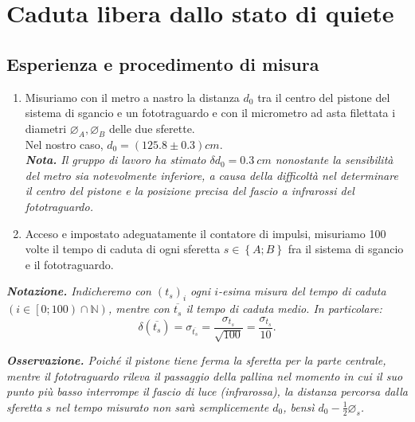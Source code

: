 \documentclass{article}
\newcommand*{\diam}{\varnothing}
\begin{document}
\section{Caduta libera dallo stato di quiete}
\subsection{Esperienza e procedimento di misura}
\begin{enumerate}
    \item
        Misuriamo con il metro a nastro la distanza $d_0$ tra il centro
        del pistone del sistema di sgancio e un fototraguardo e con il
        micrometro ad asta filettata i diametri $\diam_A,\diam_B$ delle
        due sferette.\\
        Nel nostro caso, $d_0 = \left(125.8\pm 0.3\right)\unit{cm}$.\\
        \emph{
            \textbf{Nota.} Il gruppo di lavoro ha stimato
            $\delta d_0 = \qty{0.3}{cm}$ nonostante la sensibilità
            del metro sia notevolmente inferiore, a causa della difficoltà
            nel determinare il centro del pistone e la posizione precisa del
            fascio a infrarossi del fototraguardo.
        }
    \item
        Acceso e impostato adeguatamente il contatore di impulsi,
        misuriamo 100 volte il tempo di caduta di ogni sferetta
        $s\in\left\{A;B\right\}$
        fra il sistema di sgancio e il fototraguardo.
\end{enumerate}

\emph{
    \textbf{Notazione.} Indicheremo con $\left(t_s\right)_i$
    ogni $i$-esima misura del tempo di caduta
    $\left(i\in\left[0;100\right)\cap\mathbb{N}\right)$,
    mentre con $\overline{t_s}$ il tempo di caduta medio.
    In particolare:\[
        \delta\!\left(\overline{t_s}\right) = \sigma_{\overline{t_s}} =
        \frac{\sigma_{t_s}}{\sqrt{100}}   = \frac{\sigma_{t_s}}{10}.
    \]
}


\emph{
    \textbf{Osservazione.} Poiché il pistone tiene ferma la sferetta
    per la parte centrale, mentre il fototraguardo rileva il passaggio
    della pallina nel momento in cui il suo punto più basso interrompe il
    fascio di luce (infrarossa), la distanza percorsa dalla sferetta $s$
    nel tempo misurato non sarà semplicemente $d_0$, bensì
    $d_0 - \frac{1}{2}\diam_s$.
}
\end{document}
